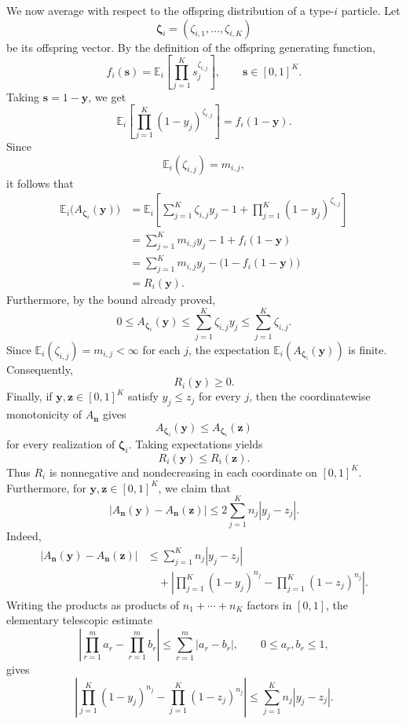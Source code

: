\documentclass[reqno,final,11pt]{amsart}
\newcommand{\1}{\mathbbm{1}}
\theoremstyle{plain}
\theoremstyle{definition}
\theoremstyle{remark}
\begin{document}
We now average with respect to the offspring distribution of a type-\(i\)
particle. Let
\[
\boldsymbol\zeta_i=(\zeta_{i,1},\dots,\zeta_{i,K})
\]
be its offspring vector. By the definition of the offspring generating function,
\[
f_i(\mathbf s)
=
\mathbb E_i\left[
\prod_{j=1}^K s_j^{\zeta_{i,j}}
\right],
\qquad \mathbf s\in[0,1]^K.
\]
Taking \(\mathbf s=1-\mathbf y\), we get
\[
\mathbb E_i\left[
\prod_{j=1}^K(1-y_j)^{\zeta_{i,j}}
\right]
=
f_i(1-\mathbf y).
\]
Since
\[
\mathbb E_i(\zeta_{i,j})=m_{i,j},
\]
it follows that
\[
\begin{aligned}
\mathbb E_i\bigl(A_{\boldsymbol\zeta_i}(\mathbf y)\bigr)
&=
\mathbb E_i\left[
\sum_{j=1}^K \zeta_{i,j}y_j
-
1
+
\prod_{j=1}^K(1-y_j)^{\zeta_{i,j}}
\right]  \\
&=
\sum_{j=1}^K m_{i,j}y_j
-
1
+
f_i(1-\mathbf y) \\
&=
\sum_{j=1}^K m_{i,j}y_j
-
\bigl(1-f_i(1-\mathbf y)\bigr) \\
&=
R_i(\mathbf y).
\end{aligned}
\]
Furthermore, by the bound already proved,
\[
0\le
A_{\boldsymbol\zeta_i}(\mathbf y)
\le
\sum_{j=1}^K \zeta_{i,j}y_j
\le
\sum_{j=1}^K \zeta_{i,j}.
\]
Since \(\mathbb E_i(\zeta_{i,j})=m_{i,j}<\infty\) for each \(j\), the expectation
\(\mathbb E_i(A_{\boldsymbol\zeta_i}(\mathbf y))\) is finite. Consequently,
\[
R_i(\mathbf y)\ge0.
\]
Finally, if \(\mathbf y,\mathbf z\in[0,1]^K\) satisfy \(y_j\le z_j\) for every
\(j\), then the coordinatewise monotonicity of \(A_{\mathbf n}\) gives
\[
A_{\boldsymbol\zeta_i}(\mathbf y)
\le
A_{\boldsymbol\zeta_i}(\mathbf z)
\]
for every realization of \(\boldsymbol\zeta_i\). Taking expectations yields
\[
R_i(\mathbf y)\le R_i(\mathbf z).
\]
Thus \(R_i\) is nonnegative and nondecreasing in each coordinate on
\([0,1]^K\). Furthermore, for \(\mathbf y,\mathbf z\in[0,1]^K\), we claim that
\[
|A_{\mathbf n}(\mathbf y)-A_{\mathbf n}(\mathbf z)|
\le
2\sum_{j=1}^K n_j|y_j-z_j|.
\]
Indeed,
\[
\begin{aligned}
|A_{\mathbf n}(\mathbf y)-A_{\mathbf n}(\mathbf z)|
&\le
\sum_{j=1}^K n_j|y_j-z_j| \\
&\quad+
\left|
\prod_{j=1}^K(1-y_j)^{n_j}
-
\prod_{j=1}^K(1-z_j)^{n_j}
\right|.
\end{aligned}
\]
Writing the products as products of \(n_1+\cdots+n_K\) factors in \([0,1]\), the
elementary telescopic estimate
\[
\left|\prod_{r=1}^m a_r-\prod_{r=1}^m b_r\right|
\le
\sum_{r=1}^m |a_r-b_r|,
\qquad 0\le a_r,b_r\le1,
\]
gives
\[
\left|
\prod_{j=1}^K(1-y_j)^{n_j}
-
\prod_{j=1}^K(1-z_j)^{n_j}
\right|
\le
\sum_{j=1}^K n_j|y_j-z_j|.
\]
\end{document}
